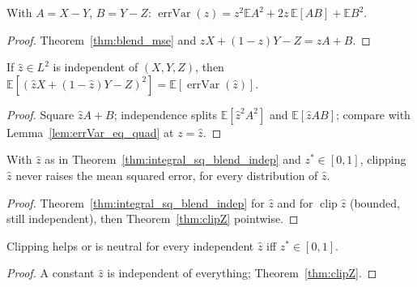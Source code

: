 \begin{lemma}\label{lem:errVar_eq_quad}
  \leanok
  With $A = X - Y$, $B = Y - Z$: $\operatorname{errVar}(z) = z^2\mathbb EA^2 + 2z\,\mathbb E[AB] + \mathbb EB^2$.
\end{lemma}
\begin{proof}
  \leanok
  Theorem~\ref{thm:blend_mse} and $zX + (1-z)Y - Z = zA + B$.
\end{proof}

\begin{theorem}\label{thm:integral_sq_blend_indep}
  \leanok
  If $\hat z \in L^2$ is independent of $(X, Y, Z)$, then
  $\mathbb E[(\hat zX + (1-\hat z)Y - Z)^2] = \mathbb E[\operatorname{errVar}(\hat z)]$.
\end{theorem}
\begin{proof}
  \leanok
  Square $\hat zA + B$; independence splits $\mathbb E[\hat z^2A^2]$ and $\mathbb E[\hat zAB]$; compare with
  Lemma~\ref{lem:errVar_eq_quad} at $z = \hat z$.
\end{proof}

\begin{theorem}\label{thm:integral_sq_blend_clip_le}
  \leanok
  With $\hat z$ as in Theorem~\ref{thm:integral_sq_blend_indep} and $z^* \in [0, 1]$, clipping $\hat z$ never
  raises the mean squared error, for every distribution of $\hat z$.
\end{theorem}
\begin{proof}
  \leanok
  Theorem~\ref{thm:integral_sq_blend_indep} for $\hat z$ and for $\operatorname{clip}\hat z$ (bounded, still
  independent), then Theorem~\ref{thm:clipZ} pointwise.
\end{proof}

\begin{theorem}\label{thm:integral_sq_blend_clip_le_iff}
  \leanok
  Clipping helps or is neutral for every independent $\hat z$ iff $z^* \in [0, 1]$.
\end{theorem}
\begin{proof}
  \leanok
  A constant $\hat z$ is independent of everything; Theorem~\ref{thm:clipZ}.
\end{proof}

